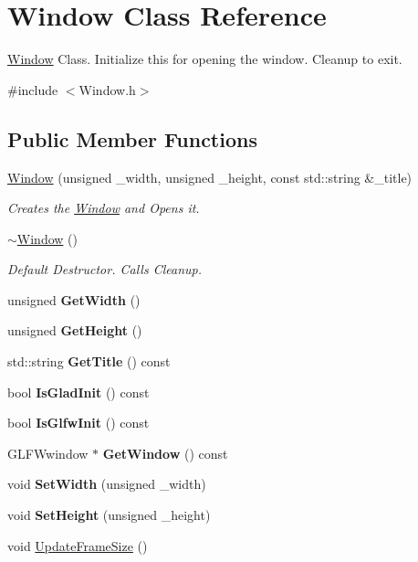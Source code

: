 \hypertarget{class_window}{}\section{Window Class Reference}
\label{class_window}


\mbox{\hyperlink{class_window}{Window}} Class. Initialize this for opening the window. Cleanup to exit.  




{\ttfamily \#include $<$Window.\+h$>$}

\subsection*{Public Member Functions}
\begin{DoxyCompactItemize}
\item 
\mbox{\hyperlink{class_window_a65335a745eaadd9dbdbd265b7fbf0fc5}{Window}} (unsigned \+\_\+width, unsigned \+\_\+height, const std\+::string \&\+\_\+title)
\begin{DoxyCompactList}\small\item\em Creates the \mbox{\hyperlink{class_window}{Window}} and Opens it. \end{DoxyCompactList}\item 
\mbox{\label{class_window_a245d821e6016fa1f6970ccbbedd635f6}} 
\mbox{\hyperlink{class_window_a245d821e6016fa1f6970ccbbedd635f6}{$\sim$\+Window}} ()
\begin{DoxyCompactList}\small\item\em Default Destructor. Calls Cleanup. \end{DoxyCompactList}\item 
unsigned {\bfseries Get\+Width} ()
\item 
unsigned {\bfseries Get\+Height} ()
\item 
std\+::string {\bfseries Get\+Title} () const
\item 
bool {\bfseries Is\+Glad\+Init} () const
\item 
bool {\bfseries Is\+Glfw\+Init} () const
\item 
G\+L\+F\+Wwindow $\ast$ {\bfseries Get\+Window} () const
\item 
void {\bfseries Set\+Width} (unsigned \+\_\+width)
\item 
void {\bfseries Set\+Height} (unsigned \+\_\+height)
\item 
void \mbox{\hyperlink{group___getters_gac825ddc0aeda29fae94c5fc910f3f04d}{Update\+Frame\+Size}} ()

\end{DoxyCompactItemize}
